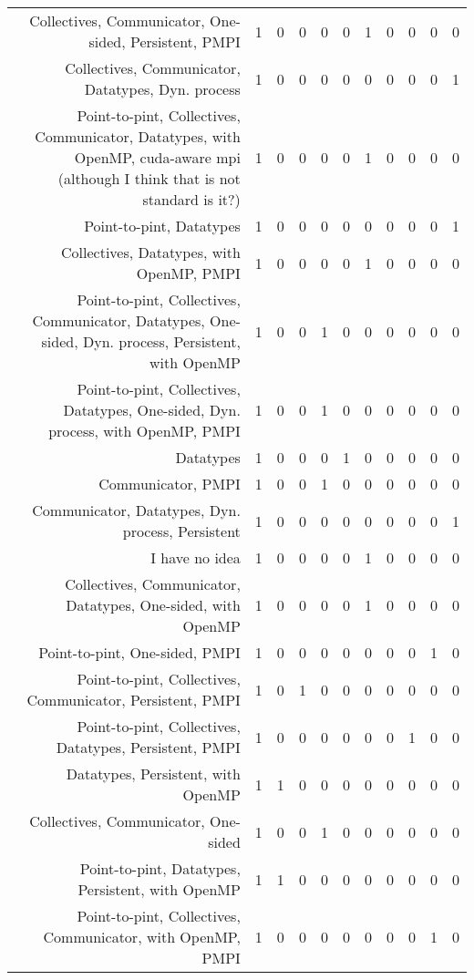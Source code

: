 {\begin{landscape}
\begin{longtable}[htb]{r|c|c|c|c|c|c|c|c|c|c}
{Collectives, Communicator, One-sided, Persistent, PMPI} & 1 & 0 & 0 & 0 & 0 & 1 & 0 & 0 & 0 & 0 \\%
{Collectives, Communicator, Datatypes, Dyn. process} & 1 & 0 & 0 & 0 & 0 & 0 & 0 & 0 & 0 & 1 \\%
{Point-to-pint, Collectives, Communicator, Datatypes, with OpenMP, cuda-aware mpi (although I think that is not standard is it?)} & 1 & 0 & 0 & 0 & 0 & 1 & 0 & 0 & 0 & 0 \\%
{Point-to-pint, Datatypes} & 1 & 0 & 0 & 0 & 0 & 0 & 0 & 0 & 0 & 1 \\%
{Collectives, Datatypes, with OpenMP, PMPI} & 1 & 0 & 0 & 0 & 0 & 1 & 0 & 0 & 0 & 0 \\%
{Point-to-pint, Collectives, Communicator, Datatypes, One-sided, Dyn. process, Persistent, with OpenMP} & 1 & 0 & 0 & 1 & 0 & 0 & 0 & 0 & 0 & 0 \\%
{Point-to-pint, Collectives, Datatypes, One-sided, Dyn. process, with OpenMP, PMPI} & 1 & 0 & 0 & 1 & 0 & 0 & 0 & 0 & 0 & 0 \\%
{Datatypes} & 1 & 0 & 0 & 0 & 1 & 0 & 0 & 0 & 0 & 0 \\%
{Communicator, PMPI} & 1 & 0 & 0 & 1 & 0 & 0 & 0 & 0 & 0 & 0 \\%
{Communicator, Datatypes, Dyn. process, Persistent} & 1 & 0 & 0 & 0 & 0 & 0 & 0 & 0 & 0 & 1 \\%
{I have no idea} & 1 & 0 & 0 & 0 & 0 & 1 & 0 & 0 & 0 & 0 \\%
{Collectives, Communicator, Datatypes, One-sided, with OpenMP} & 1 & 0 & 0 & 0 & 0 & 1 & 0 & 0 & 0 & 0 \\%
{Point-to-pint, One-sided, PMPI} & 1 & 0 & 0 & 0 & 0 & 0 & 0 & 0 & 1 & 0 \\%
{Point-to-pint, Collectives, Communicator, Persistent, PMPI} & 1 & 0 & 1 & 0 & 0 & 0 & 0 & 0 & 0 & 0 \\%
{Point-to-pint, Collectives, Datatypes, Persistent, PMPI} & 1 & 0 & 0 & 0 & 0 & 0 & 0 & 1 & 0 & 0 \\%
{Datatypes, Persistent, with OpenMP} & 1 & 1 & 0 & 0 & 0 & 0 & 0 & 0 & 0 & 0 \\%
{Collectives, Communicator, One-sided} & 1 & 0 & 0 & 1 & 0 & 0 & 0 & 0 & 0 & 0 \\%
{Point-to-pint, Datatypes, Persistent, with OpenMP} & 1 & 1 & 0 & 0 & 0 & 0 & 0 & 0 & 0 & 0 \\%
{Point-to-pint, Collectives, Communicator, with OpenMP, PMPI} & 1 & 0 & 0 & 0 & 0 & 0 & 0 & 0 & 1 & 0 \\%

\end{longtable}
\end{landscape}}
